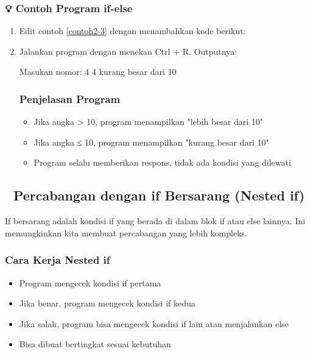 \subsubsection*{💡 Contoh Program if-else}

\begin{enumerate}
\item Edit contoh \ref{contoh2-3} dengan menambahkan kode berikut:



\item Jalankan program dengan menekan Ctrl + R. Outputnya:

\begin{lcverbatim}
Masukan nomor: 4
4 kurang besar dari 10
\end{lcverbatim}

\subsubsection*{Penjelasan Program}
\begin{itemize}
\item Jika angka > 10, program menampilkan "lebih besar dari 10"
\item Jika angka ≤ 10, program menampilkan "kurang besar dari 10"
\item Program selalu memberikan respons, tidak ada kondisi yang dilewati
\end{itemize}
\end{enumerate}

\subsection{🔄 Percabangan dengan if Bersarang (Nested if)}

If bersarang adalah kondisi if yang berada di dalam blok if atau else lainnya. Ini memungkinkan kita membuat percabangan yang lebih kompleks.

\subsubsection{Cara Kerja Nested if}

\begin{itemize}
\item Program mengecek kondisi if pertama
\item Jika benar, program mengecek kondisi if kedua
\item Jika salah, program bisa mengecek kondisi if lain atau menjalankan else
\item Bisa dibuat bertingkat sesuai kebutuhan
\end{itemize}


